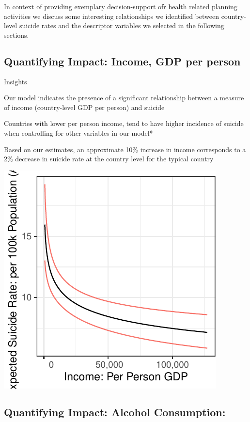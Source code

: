 \documentclass[]{article}
\begin{document}
In context of providing exemplary decision-support ofr health related
planning activities we discuss some interesting relationships we
identified between country-level suicide rates and the descriptor
variables we selected in the following sections.

\subsection{Quantifying Impact: Income, GDP per
person}\label{quantifying-impact-income-gdp-per-person}

Insights

Our model indicates the presence of a significant relationship between a
measure of income (country-level GDP per person) and suicide~

Countries with lower per person income, tend to have higher incidence of
suicide when controlling for other variables in our model*

Based on our estimates, an approximate 10\% increase in income
corresponds to a 2\% decrease in suicide rate at the country level for
the typical country

\begin{center}\includegraphics{Project_Report_files/figure-latex/agdp_plot-1} \end{center}

\subsection{Quantifying Impact: Alcohol
Consumption:}\label{quantifying-impact-alcohol-consumption}
\end{document}
